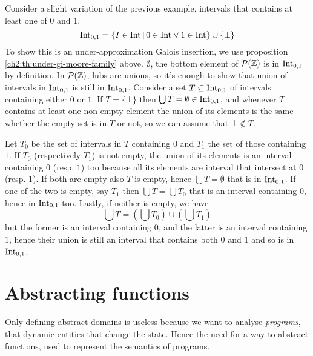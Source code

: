 \begin{example}
	Consider a slight variation of the previous example, intervals that contains at least one of $0$ and $1$.
	\[
	\text{Int}_{0,1} = \{ I \in \text{Int} \,\vert\, 0 \in \text{Int} \lor 1 \in \text{Int} \} \cup \{ \bot \}
	\]
	To show this is an under-approximation Galois insertion, we use proposition \ref{ch2:th:under-gi-moore-family} above.
	$\emptyset$, the bottom element of $\mathcal{P}(\mathbb{Z})$ is in $\text{Int}_{0,1}$ by definition. In $\mathcal{P}(\mathbb{Z})$, lubs are unions, so it's enough to show that union of intervals in $\text{Int}_{0,1}$ is still in $\text{Int}_{0,1}$.
	Consider a set $T \subseteq \text{Int}_{0,1}$ of intervals containing either $0$ or $1$. If $T = \{ \bot \}$ then $\bigcup T = \emptyset \in \text{Int}_{0,1}$, and whenever $T$ contains at least one non empty element the union of its elements is the same whether the empty set is in $T$ or not, so we can assume that $\bot \notin T$.

	Let $T_0$ be the set of intervals in $T$ containing $0$ and $T_1$ the set of those containing $1$. If $T_0$ (respectively $T_1$) is not empty, the union of its elements is an interval containing $0$ (resp. $1$) too because all its elements are interval that intersect at $0$ (resp. $1$). If both are empty also $T$ is empty, hence $\bigcup T = \emptyset$ that is in $\text{Int}_{0,1}$. If one of the two is empty, say $T_1$ then $\bigcup T = \bigcup T_0$ that is an interval containing $0$, hence in $\text{Int}_{0,1}$ too. Lastly, if neither is empty, we have
	\[
	\bigcup T = \left( \bigcup T_0 \right) \cup \left( \bigcup T_1 \right)
	\]
	but the former is an interval containing $0$, and the latter is an interval containing $1$, hence their union is still an interval that contains both $0$ and $1$ and so is in $\text{Int}_{0,1}$.
\end{example}

\section{Abstracting functions}
Only defining abstract domains is useless because we want to analyse \textit{programs}, that dynamic entities that change the state. Hence the need for a way to abstract functions, used to represent the semantics of programs.

